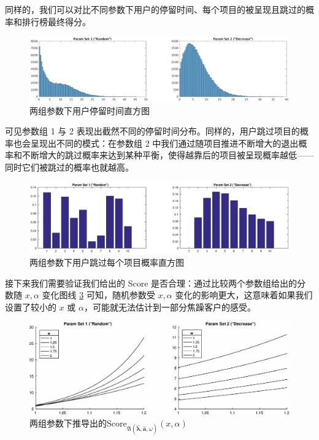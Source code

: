 \documentclass[UTF8]{ctexart}
\theoremstyle{plain}
\theoremstyle{definition}
\theoremstyle{remark}
\begin{document}
	同样的，我们可以对比不同参数下用户的停留时间、每个项目的被呈现且跳过的概率和排行榜最终得分。
	
	\begin{figure}[h!] 
		\centering
		\includegraphics[width = \linewidth]{../model/meituan/pic/random-decrease-time-compare-M-100000.eps}
		\caption{两组参数下用户停留时间直方图}\label{fig:random-decrease-time-compare-M-100000}
	\end{figure}

	可见参数组 1 与 2 表现出截然不同的停留时间分布。同样的，用户跳过项目的概率也会呈现出不同的模式：在参数组 2 中我们通过随项目推进不断增大的退出概率和不断增大的跳过概率来达到某种平衡，使得越靠后的项目被呈现概率越低——同时它们被跳过的概率也就越高。

	\begin{figure}[h!] 
		\centering
		\includegraphics[width = \linewidth]{../model/meituan/pic/random-decrease-skip-compare-M-100000.eps}
		\caption{两组参数下用户跳过每个项目概率直方图}\label{fig:random-decrease-skip-compare-M-100000}
	\end{figure}

	接下来我们需要验证我们给出的 Score 是否合理：通过比较两个参数组给出的分数随 $x, \alpha$ 变化图线 \ref{fig:random-decrease-score-compare-M-100000} 可知，随机参数受 $x, \alpha$ 变化的影响更大，这意味着如果我们设置了较小的 $x$ 或 $\alpha$，可能就无法估计到一部分焦躁客户的感受。
	
	\begin{figure}[h!] 
		\centering
		\includegraphics[width = \linewidth]{../model/meituan/pic/random-decrease-score-compare-M-100000.eps}
		\caption{两组参数下推导出的$\mathrm{Score}_{\mathfrak{A}\left(\bm{\hat{\lambda}}, \bm{\hat{a}}, \omega\right)}(x, \alpha)$}\label{fig:random-decrease-score-compare-M-100000}
	\end{figure}
	
\end{document}
